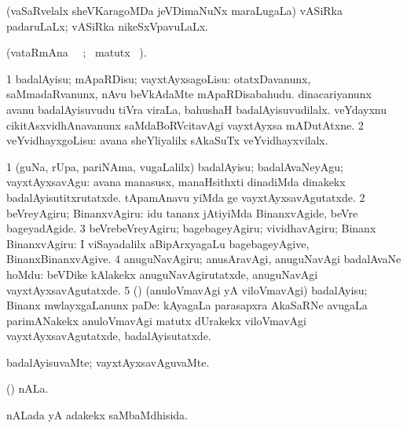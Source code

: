 \bentry
{} 
\gl{\gu}
\expl{}
\bmng
 (vaSaRvelalx sheVKaragoMDa jeVDimaNuNx maraLugaLa) vASiRka padaruLaLx; vASiRka nikeSxVpavuLaLx. 
\emng
\eentry

\bentry
{} 
\gl{\kirx} 
\bmng
(vataRmAna \parxpu\ \Eva\ ; \BU\ matutx  \BUkaq\ ).
\emng

\noindent
\gl{\sakirx}
\bmng
\bnum
\num{1} badalAyisu; mApaRDisu; vayxtAyxsagoLisu:  otatxDavanunx, saMmadaRvanunx, nAvu beVkAdaMte mApaRDisabahudu.  dinacariyanunx avanu badalAyisuvudu tiVra viraLa, bahushaH badalAyisuvudilalx.  veYdayxnu cikitAsxvidhAnavanunx saMdaBoRVcitavAgi vayxtAyxsa mADutAtxne. 
\num{2} veYvidhayxgoLisu:  avana sheYliyalilx sAkaSuTx veYvidhayxvilalx. 
\enum
\emng

\noindent
\gl{\akirx}
\expl{}
\bmng
\bnum
\num{1} (guNa, rUpa, pariNAma, \mo vugaLalilx) badalAyisu; badalAvaNeyAgu; vayxtAyxsavAgu:  avana manasusx, manaHsithxti dinadiMda dinakekx badalAyisutitxrutatxde.     tApamAnavu  yiMda  ge vayxtAyxsavAgutatxde. 
\num{2} beVreyAgiru; BinanxvAgiru:  idu tananx jAtiyiMda BinanxvAgide, beVre bageyadAgide. 
\num{3} beVrebeVreyAgiru; bagebageyAgiru; vividhavAgiru; Binanx BinanxvAgiru:  I viSayadalilx aBipArxyagaLu bagebageyAgive, BinanxBinanxvAgive. 
\num{4} anuguNavAgiru; anusAravAgi, anuguNavAgi badalAvaNe hoMdu:  beVDike kAlakekx anuguNavAgirutatxde, anuguNavAgi vayxtAyxsavAgutatxde. 
\num{5} (\ga) (anuloVmavAgi yA viloVmavAgi) badalAyisu; Binanx mwlayxgaLanunx paDe:  kAyagaLa parasapxra AkaSaRNe avugaLa parimANakekx anuloVmavAgi matutx dUrakekx viloVmavAgi vayxtAyxsavAgutatxde, badalAyisutatxde. 
\enum
\emng
\eentry

\bentry
{} 
\gl{\kirxvi}
\expl{}
\bmng
 badalAyisuvaMte; vayxtAyxsavAguvaMte. 
\emng
\eentry

\bentry
{} 
\gl{\nA}
\bmng
(\aMrashA) nALa. 
\emng
\eentry

\bentry
{} 
\gl{\gu}
\expl{}
\bmng
nALada yA adakekx saMbaMdhisida. 
\emng
\eentry


